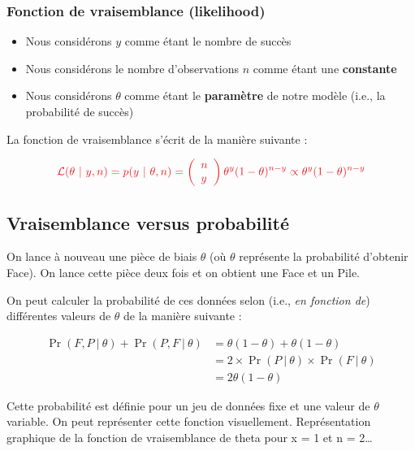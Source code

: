 \documentclass[
  a4paper,11pt,twoside,onecolumn,openright,final,oldfontcommands]{memoir}
\providecommand{\tightlist}{%
  \setlength{\itemsep}{0pt}\setlength{\parskip}{0pt}}
\theoremstyle{definition}
\theoremstyle{definition}
\theoremstyle{definition}
\theoremstyle{definition}
\theoremstyle{remark}
\begin{document}
\hypertarget{fonction-de-vraisemblance-likelihood}{%
\subsubsection{Fonction de vraisemblance (likelihood)}\label{fonction-de-vraisemblance-likelihood}}

\begin{itemize}
\tightlist
\item
  Nous considérons \(y\) comme étant le nombre de succès
\item
  Nous considérons le nombre d'observations \(n\) comme étant une \textbf{constante}
\item
  Nous considérons \(\theta\) comme étant le \textbf{paramètre} de notre modèle (i.e., la probabilité de succès)
\end{itemize}

La fonction de vraisemblance s'écrit de la manière suivante :

\[
\color{orangered}{\mathcal{L}(\theta\ |\ y, n) = p(y \ |\ \theta, n) = \left(\begin{array}{l} n \\ y \end{array}\right) \theta^{y}(1 - \theta)^{n - y} \propto \theta^{y}(1 - \theta)^{n - y}}
\]

\hypertarget{vraisemblance-versus-probabilituxe9}{%
\subsection{Vraisemblance versus probabilité}\label{vraisemblance-versus-probabilituxe9}}

On lance à nouveau une pièce de biais \(\theta\) (où \(\theta\) représente la probabilité d'obtenir Face). On lance cette pièce deux fois et on obtient une Face et un Pile.

On peut calculer la probabilité de ces données selon (i.e., \emph{en fonction de}) différentes valeurs de \(\theta\) de la manière suivante :

\[
\begin{aligned}
\Pr(F, P \ | \ \theta) + \Pr(P, F \ | \ \theta) &= \theta(1 - \theta) + \theta(1 - \theta) \\
&= 2 \times \Pr(P \ | \ \theta) \times \Pr(F \ | \ \theta) \\
&= 2 \theta(1 - \theta)
\end{aligned}
\]

Cette probabilité est définie pour un jeu de données fixe et une valeur de \(\theta\) variable. On peut représenter cette fonction visuellement. Représentation graphique de la fonction de vraisemblance de theta pour x = 1 et n = 2\ldots{}
\end{document}
